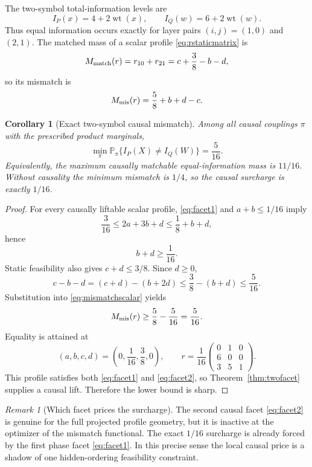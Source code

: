 \documentclass[11pt,a4paper]{article}
\newtheorem{corollary}[theorem]{Corollary}
\theoremstyle{definition}
\theoremstyle{remark}
\newtheorem{remark}[theorem]{Remark}
\newcommand{\Pp}{\mathbb P}
\newcommand{\wt}{\operatorname{wt}}
\begin{document}
The two-symbol total-information levels are
\[
 I_P(x)=4+2\wt(x),
 \qquad
 I_Q(w)=6+2\wt(w).
\]
Thus equal information occurs exactly for layer pairs \((i,j)=(1,0)\) and
\((2,1)\).  The matched mass of a scalar profile \eqref{eq:rstaticmatrix} is
\begin{equation}
 M_{\rm match}(r)=r_{10}+r_{21}
 =c+\frac38-b-d,
 \label{eq:matchedmass}
\end{equation}
so its mismatch is
\begin{equation}
 M_{\rm mis}(r)=\frac58+b+d-c.
 \label{eq:mismatchscalar}
\end{equation}

\begin{corollary}[Exact two-symbol causal mismatch]
\label{thm:5over16}
Among all causal couplings \(\pi\) with the prescribed product marginals,
\begin{equation}
 \boxed{
 \min_\pi \Pp_\pi\{I_P(X)\ne I_Q(W)\}=\frac5{16}.
 }
 \label{eq:5over16}
\end{equation}
Equivalently, the maximum causally matchable equal-information mass is
\(11/16\).  Without causality the minimum mismatch is \(1/4\), so the causal
surcharge is exactly \(1/16\).
\end{corollary}

\begin{proof}
For every causally liftable scalar profile, \eqref{eq:facet1} and
\(a+b\le1/16\) imply
\[
 \frac3{16}
 \le2a+3b+d
 \le\frac18+b+d,
\]
hence
\begin{equation}
 b+d\ge\frac1{16}.
 \label{eq:bdlower}
\end{equation}
Static feasibility also gives \(c+d\le3/8\).  Since \(d\ge0\),
\[
 c-b-d=(c+d)-(b+2d)
 \le\frac38-(b+d)
 \le\frac5{16}.
\]
Substitution into \eqref{eq:mismatchscalar} yields
\[
 M_{\rm mis}(r)\ge\frac58-\frac5{16}=\frac5{16}.
\]
Equality is attained at
\begin{equation}
 (a,b,c,d)=\left(0,\frac1{16},\frac38,0\right),
 \qquad
 r=\frac1{16}
 \begin{pmatrix}
 0&1&0\\
 6&0&0\\
 3&5&1
 \end{pmatrix}.
 \label{eq:optimalr}
\end{equation}
This profile satisfies both \eqref{eq:facet1} and \eqref{eq:facet2}, so
Theorem~\ref{thm:twofacet} supplies a causal lift.  Therefore the lower bound
is sharp.
\end{proof}

\begin{remark}[Which facet prices the surcharge]
The second causal facet \eqref{eq:facet2} is genuine for the full projected
profile geometry, but it is inactive at the optimizer of the mismatch
functional.  The exact \(1/16\) surcharge is already forced by the first
phase facet \eqref{eq:facet1}.  In this precise sense the local causal price is
a shadow of one hidden-ordering feasibility constraint.
\end{remark}
\end{document}
